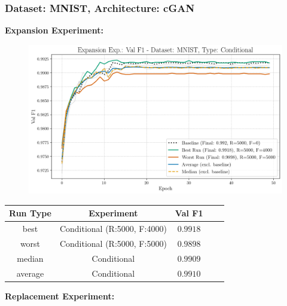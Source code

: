 \subsubsection{Dataset: MNIST, Architecture: cGAN}
\noindent\textbf{Expansion Experiment:}
\begin{figure}[htbp]
	\centering
	\includegraphics[width=.85\textwidth]{abb/strat_classifier_performance/MNIST_STRATIFIED_CLASSIFIERS_COND_GAN/expansion_experiments/val_f1_score_['COND']_MNIST_all.png}
	\label{fig:app_strat_class_performance_expansion_exp._val_f1_score_cGAN}
\end{figure}
\begin{table}[H]
	\centering
	\vspace{-1em}
	\begin{tabular}{|c|c|c|c|c|}
		\hline
		Run Type & Experiment & Val F1 \\ \hline
		best & Conditional (R:5000, F:4000) & $0.9918$\\ \hline
		worst & Conditional (R:5000, F:5000) & $0.9898$\\ \hline
		median & Conditional & $0.9909$\\ \hline
		average & Conditional & $0.9910$
		\\ \hline
	\end{tabular}
\end{table}
\noindent\textbf{Replacement Experiment:}
